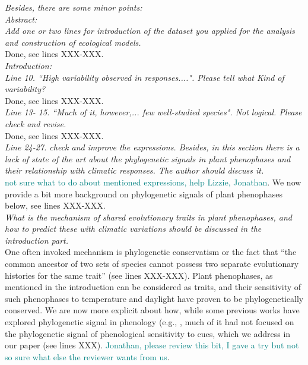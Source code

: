 \documentclass[11pt]{article}
\begin{document}
\emph{Besides, there are some minor points:}\\


\emph{Abstract:}\\
\emph{Add one or two lines for introduction of the dataset you applied for the analysis and construction of ecological models.}\\
Done, see lines XXX-XXX.\\

\emph{Introduction:}\\
\emph{Line 10. ``High variability observed in responses....". Please tell what Kind of variability?}\\
Done, see lines XXX-XXX.\\

\emph{Line 13- 15. ``Much of it, however,... few well-studied species". Not logical. Please check and revise.}\\
Done, see lines XXX-XXX.\\

\emph{Line 24-27. check and improve the expressions. Besides, in this section there is a lack of state of the art about the phylogenetic signals in plant phenophases and their relationship with climatic responses. The author should discuss it.}\\
\textcolor{teal}{not sure what to do about mentioned expressions, help Lizzie, Jonathan}. We now provide a bit more background on phylogenetic signals of plant phenophases below, see lines XXX-XXX.\\

\emph{What is the mechanism of shared evolutionary traits in plant phenophases, and how to predict these with climatic variations should be discussed in the introduction part.}\\
One often invoked mechanism is phylogenetic conservatism or the fact that ``the common ancestor of two sets of species cannot possess two separate evolutionary histories for the same trait'' (see lines XXX-XXX). Plant phenophases, as mentioned in the introduction can be considered as traits, and their sensitivity of such phenophases to temperature and daylight have proven to be phylogenetically conserved. We are now more explicit about how, while some previous works have explored phylogenetic signal in phenology (e.g., \cite{davies2013phylogenetic}, much of it had not focused on the phylogenetic signal of phenological sensitivity to cues, which we address in our paper (see lines XXX).
\textcolor{teal}{Jonathan, please review this bit, I gave a try but not so sure what else the reviewer wants from us}.\\
\end{document}
